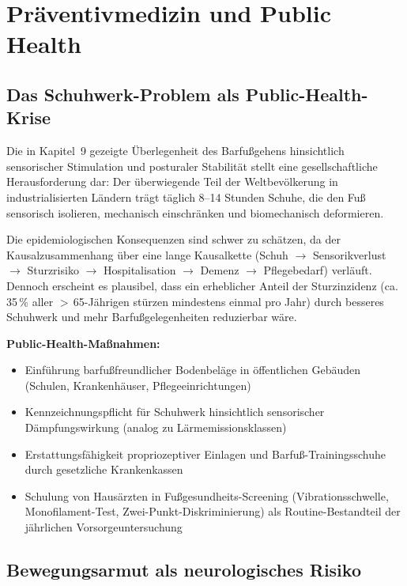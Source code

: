 ﻿\documentclass[12pt,a4paper]{report}
\theoremstyle{plain}
\theoremstyle{definition}
\theoremstyle{remark}
\begin{document}
\section{Präventivmedizin und Public Health}

\subsection{Das Schuhwerk-Problem als Public-Health-Krise}

Die in Kapitel~9 gezeigte Überlegenheit des Barfußgehens hinsichtlich
sensorischer Stimulation und posturaler Stabilität stellt eine
gesellschaftliche Herausforderung dar: Der überwiegende Teil der
Weltbevölkerung in industrialisierten Ländern trägt täglich
8--14 Stunden Schuhe, die den Fuß sensorisch isolieren, mechanisch
einschränken und biomechanisch deformieren.

Die epidemiologischen Konsequenzen sind schwer zu schätzen, da der
Kausalzusammenhang über eine lange Kausalkette (Schuh $\to$
Sensorikverlust $\to$ Sturzrisiko $\to$ Hospitalisation $\to$
Demenz $\to$ Pflegebedarf) verläuft. Dennoch erscheint es
plausibel, dass ein erheblicher Anteil der Sturzinzidenz (ca.\,35\,\%
aller $>$\,65-Jährigen stürzen mindestens einmal pro Jahr) durch
besseres Schuhwerk und mehr Barfußgelegenheiten reduzierbar wäre.

\textbf{Public-Health-Maßnahmen:}
\begin{itemize}
\item Einführung barfußfreundlicher Bodenbeläge in öffentlichen
  Gebäuden (Schulen, Krankenhäuser, Pflegeeinrichtungen)
\item Kennzeichnungspflicht für Schuhwerk hinsichtlich
  sensorischer Dämpfungswirkung (analog zu Lärmemissionsklassen)
\item Erstattungsfähigkeit propriozeptiver Einlagen und
  Barfuß-Trainingsschuhe durch gesetzliche Krankenkassen
\item Schulung von Hausärzten in Fußgesundheits-Screening
  (Vibrationsschwelle, Monofilament-Test, Zwei-Punkt-Diskriminierung)
  als Routine-Bestandteil der jährlichen Vorsorgeuntersuchung
\end{itemize}

\subsection{Bewegungsarmut als neurologisches Risiko}
\end{document}
